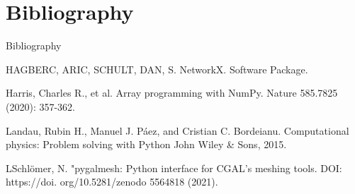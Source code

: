 \documentclass{beamer}
\begin{document}
\section*{Bibliography}
\begin{frame}[allowframebreaks]{Bibliography}

\beamertemplatebookbibitems
\begin{thebibliography}{}
HAGBERC, ARIC, SCHULT, DAN, S. \newblock \textquotedbl NetworkX.\textquotedbl{} \newblock Software Package.

\bibitem{-}Harris, Charles R., et al. \newblock \textquotedbl Array programming with NumPy.\textquotedbl{} \newblock Nature 585.7825 (2020): 357-362.

\bibitem{--}Landau, Rubin H., Manuel J. Páez, and Cristian C. Bordeianu. \newblock \textquotedbl Computational physics: Problem solving with Python\textquotedbl{} \newblock John Wiley & Sons, 2015.

\bibitem{---}LSchlömer, N. \newblock \textquotedbl "pygalmesh: Python interface for CGAL’s meshing tools.\textquotedbl{} \newblock DOI: https://doi. org/10.5281/zenodo 5564818 (2021).

\end{thebibliography}
\end{frame}
\end{document}
